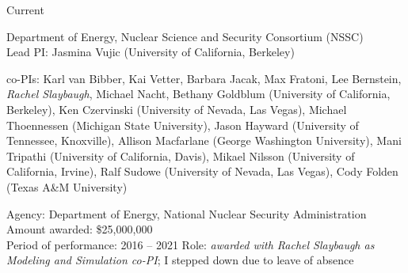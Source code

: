 \begin{rSubsection}{Current}{}{}{}
\vspace*{0.3 em}
\item Department of Energy, Nuclear Science and Security Consortium (NSSC)\\
Lead PI: Jasmina Vujic (University of California, Berkeley)
\vspace*{-.6 em}
\begin{addmargin}[1em]{0 em}
co-PIs: Karl van Bibber, Kai Vetter, Barbara Jacak, Max Fratoni, Lee Bernstein, \textit{Rachel Slaybaugh}, Michael Nacht, Bethany Goldblum (University of California, Berkeley), Ken Czervinski (University of Nevada, Las Vegas), Michael Thoennessen (Michigan State University), Jason Hayward (University of Tennessee, Knoxville), Allison Macfarlane (George Washington University), Mani Tripathi (University of California, Davis), Mikael Nilsson (University of California, Irvine), Ralf Sudowe (University of Nevada, Las Vegas), Cody Folden (Texas A\&M University)
\end{addmargin}
\vspace*{-.6 em}
Agency:  Department of Energy, National Nuclear Security Administration\\
Amount awarded: \$25,000,000\\
Period of performance: 2016 -- 2021
Role: \textit{awarded with Rachel Slaybaugh as Modeling and Simulation co-PI}; I stepped down due to leave of absence
\end{rSubsection}


